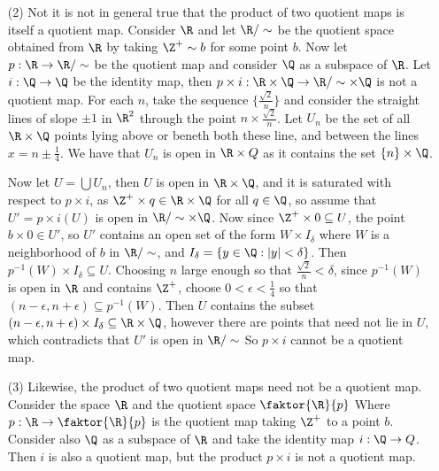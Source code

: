 \begin{example}
\begin{enumerate}
        \item[(2)] Not it is not in general true that the product of two quotient
            maps is itself a quotient map. Consider $\R$ and let  $\R/\sim$ be
            the quotient space obtained from  $\R$ by taking $\Z^+ \sim b$ for
            some point  $b$. Now let  $p:\R \rightarrow \R/\sim$ be the quotient
            map and consider  $\Q$ as a subspace of  $\R$. Let  $i:\Q \rightarrow \Q$
            be the identity map, then  $p \times i:\R \times \Q \rightarrow
            \R/\sim \times \Q$ is not a quotient map. For each  $n$, take the
            sequence  $\{\frac{\sqrt{2}}{n}\}$ and consider the straight lines
            of slope $\pm1$ in $\R^2$ through the point  $n \times
            \frac{\sqrt{2}}{n}$. Let $U_n$ be the set of all  $\R \times \Q$
            points lying above or beneth both these line, and between the lines
            $x=n \pm \frac{1}{4}$. We have that $U_n$ is open in  $\R \times Q$
            as it contains the set  $\{n\} \times \Q$.

            Now let $U=\bigcup{U_n}$, then $U$ is open in  $\R \times \Q$, and
            it is saturated with
            respect to  $p \times i$, as  $\Z^+ \times q \in \R \times \Q$ for
            all  $q \in \Q$, so assume that  $U'=p \times i(U)$ is open in
            $\R/\sim \times \Q$. Now since  $\Z^+ \times 0 \subseteq U$, the
            point  $b \times 0 \in U'$, so  $U'$ contains an open set of the form
            $W \times I_{\delta}$ where $W$ is a neighborhood of  $b$ in
            $\R/\sim$, and $I_{\delta}=\{y \in \Q:|y|<\delta\}$. Then $p^{-1}(W)
            \times I_{\delta} \subseteq U$. Choosing $n$ large enough so that
            $\frac{\sqrt{2}}{n}<\delta$, since $p^{-1}(W)$ is open in $\R$ and
            contains  $\Z^+$, choose  $0<\epsilon<\frac{1}{4}$ so that
            $(n-\epsilon,n+\epsilon) \subseteq p^{-1}(W)$. Then $U$ contains the subset
            $(n-\epsilon,n+\epsilon) \times I_{\delta} \subseteq \R \times \Q$,
            however there are points that need not lie in $U$, which contradicts
            that  $U'$ is open in $\R/\sim$ So $p \times i$ cannot be a quotient
            map.

        \item[(3)] Likewise, the product of two quotient maps need not be a
            quotient map. Consider the space $\R$ and the quotient space
            $\faktor{\R}{p}$ Where $p:\R \rightarrow \faktor{\R}{p}$ is the
            quotient map taking $\Z^+$ to a point  $b$. Consider also  $\Q$ as a
            subspace of  $\R$ and take the identity map  $i:\Q \rightarrow Q$.
            Then $i$ is also a quotient map, but the product  $p \times i$ is
            not a quotient map.


\end{enumerate}
\end{example}
